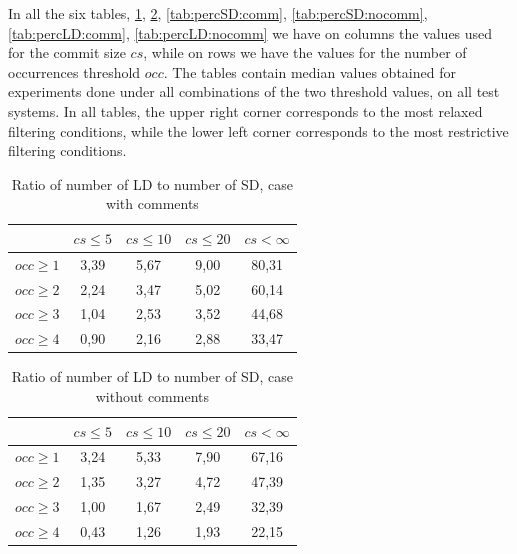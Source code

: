 \documentclass[12pt]{mitthesis}
\begin{document}
In all the six tables, \ref{tab:ratio:comm}, \ref{tab:ratio:nocomm}, \ref{tab:percSD:comm}, \ref{tab:percSD:nocomm},
\ref{tab:percLD:comm}, \ref{tab:percLD:nocomm} we have on columns the values used for the commit size $cs$, while on rows we have the values for the number of occurrences threshold $occ$. The tables contain median values obtained for experiments done under all combinations of the two threshold values, on all test systems. In all tables, the upper right corner corresponds to the most relaxed filtering conditions, while the lower left corner corresponds to the most restrictive filtering conditions.

\begin{table}[!h]
\renewcommand{\arraystretch}{1}
\caption{Ratio of number of LD to number of SD, case with comments}
\label{tab:ratio:comm}
\centering

\begin{tabular}{|c|c|c|c|c|}
\hline
	      &	$cs\leq 5$	&	$cs\leq 10$	&	$cs\leq 20$	&	$cs<\infty$	\\
\hline
$occ\geq 1$	&	3,39	&	5,67	&	9,00	&	80,31	\\
$occ\geq 2$	&	2,24	&	3,47	&	5,02	&	60,14	\\
$occ\geq 3$	&	1,04	&	2,53	&	3,52	&	44,68	\\
$occ\geq 4$	&	0,90	&	2,16	&	2,88	&	33,47	\\
\hline
\end{tabular}
\end{table}

\begin{table}[!h]
\renewcommand{\arraystretch}{1}
\caption{Ratio of number of LD to number of SD, case without comments}
\label{tab:ratio:nocomm}
\centering

\begin{tabular}{|c|c|c|c|c|}
\hline
	      &	$cs\leq 5$	&	$cs\leq 10$	&	$cs\leq 20$	&	$cs< \infty$	\\
\hline
$occ\geq 1$	&	3,24	&	5,33	&	7,90	&	67,16	\\
$occ\geq 2$	&	1,35	&	3,27	&	4,72	&	47,39	\\
$occ\geq 3$	&	1,00	&	1,67	&	2,49	&	32,39	\\
$occ\geq 4$	&	0,43	&	1,26	&	1,93	&	22,15	\\
\hline
\end{tabular}
\end{table}
\end{document}
